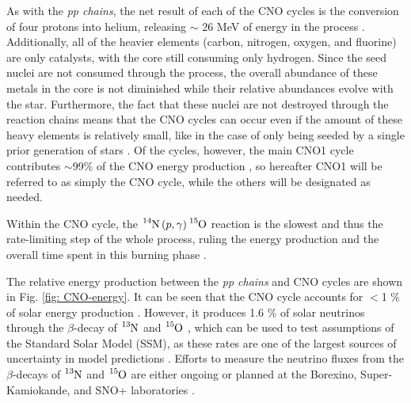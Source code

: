 \noindent As with the \textit{pp chains}, the net result of each of the CNO cycles is the conversion of four protons into helium, releasing $\sim$ 26 MeV of energy in the process \cite{RyanNortonBook}. Additionally, all of the heavier elements (carbon, nitrogen, oxygen, and fluorine) are only catalysts, with the core still consuming only hydrogen. Since the seed nuclei are not consumed through the process, the overall abundance of these metals in the core is not diminished while their relative abundances evolve with the star. Furthermore, the fact that these nuclei are not destroyed through the reaction chains means that the CNO cycles can occur even if the amount of these heavy elements is relatively small, like in the case of only being seeded by a single prior generation of stars \cite{IliadisBook}. Of the cycles, however, the main CNO1 cycle contributes $\sim$99$\%$ of the CNO energy production \cite{Adelberger1998}, so hereafter CNO1 will be referred to as simply the CNO cycle, while the others will be designated as needed. 

Within the CNO cycle, the $\ce{^{14}N} \left( p, \gamma \right) \ce{^{15}O}$ reaction is the slowest and thus the rate-limiting step of the whole process, ruling the energy production and the overall time spent in this burning phase \cite{Imbriani2004}.

The relative energy production between the \textit{pp chains} and CNO cycles are shown in Fig. \ref{fig: CNO-energy}. It can be seen that the CNO cycle accounts for $< $1 \% of solar energy production \cite{Adelberger1998, Adelberger2011}. However, it produces 1.6 \% of solar neutrinos through the $\beta$-decay of $\ce{^{13}N}$ and $\ce{^{15}O}$ \cite{Bahcall2005a}, which can be used to test assumptions of the Standard Solar Model (SSM), as these rates are one of the largest sources of uncertainty in model predictions \cite{Serenelli2013}. Efforts to measure the neutrino fluxes from the $\beta$-decays of $\ce{^{13}N}$ and $\ce{^{15}O}$ are either ongoing or planned at the Borexino, Super-Kamiokande, and SNO+ laboratories \cite{Jose2011a}.

